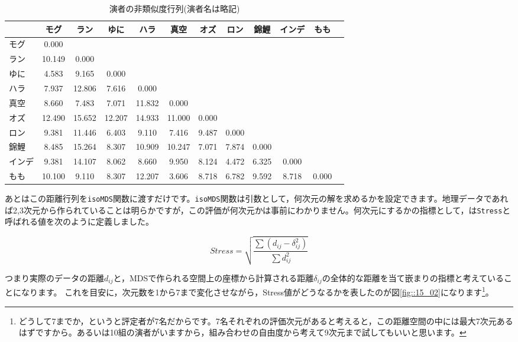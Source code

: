 \documentclass{ltjsbook}
\begin{document}
\begin{table}[ht]
	\centering
	\caption{演者の非類似度行列(演者名は略記)}
	\begin{tabular}{l|ccccccccccc}
		\hline
		    & モグ     & ラン     & ゆに     & ハラ     & 真空     & オズ    & ロン    & 錦鯉    & インデ   & もも    \\
		\hline
		モグ  & 0.000  &        &        &        &        &       &       &       &       &       \\
		ラン  & 10.149 & 0.000  &        &        &        &       &       &       &       &       \\
		ゆに  & 4.583  & 9.165  & 0.000  &        &        &       &       &       &       &       \\
		ハラ  & 7.937  & 12.806 & 7.616  & 0.000  &        &       &       &       &       &       \\
		真空  & 8.660  & 7.483  & 7.071  & 11.832 & 0.000  &       &       &       &       &       \\
		オズ  & 12.490 & 15.652 & 12.207 & 14.933 & 11.000 & 0.000 &       &       &       &       \\
		ロン  & 9.381  & 11.446 & 6.403  & 9.110  & 7.416  & 9.487 & 0.000 &       &       &       \\
		錦鯉  & 8.485  & 15.264 & 8.307  & 10.909 & 10.247 & 7.071 & 7.874 & 0.000 &       &       \\
		インデ & 9.381  & 14.107 & 8.062  & 8.660  & 9.950  & 8.124 & 4.472 & 6.325 & 0.000 &       \\
		もも  & 10.100 & 9.110  & 8.307  & 12.207 & 3.606  & 8.718 & 6.782 & 9.592 & 8.718 & 0.000 \\
		\hline
	\end{tabular}
	\label{tbl:x15_distMat}
\end{table}
あとはこの距離行列を\verb|isoMDS|関数に渡すだけです。\verb|isoMDS|関数は引数として，何次元の解を求めるかを設定できます。地理データであれば2,3次元から作られていることは明らかですが，この評価が何次元かは事前にわかりません。何次元にするかの指標として，\citet{kruskal1964}は\verb|Stress|と呼ばれる値を次のように定義しました。

\[ Stress = \sqrt{\frac{\sum(d_{ij} - \delta_{ij}^2)}{\sum d_{ij}^2}} \]

つまり実際のデータの距離$d_{ij}$と，MDSで作られる空間上の座標から計算される距離$\delta_{ij}$の全体的な距離を当て嵌まりの指標と考えていることになります。
これを目安に，次元数を1から7まで変化させながら，Stress値がどうなるかを表したのが図\ref{fig::15_02}になります\footnote{どうして7までか，というと評定者が7名だからです。7名それぞれの評価次元があると考えると，この距離空間の中には最大7次元あるはずですから。あるいは10組の演者がいますから，組み合わせの自由度から考えて9次元まで試してもいいと思います。}。
\end{document}

